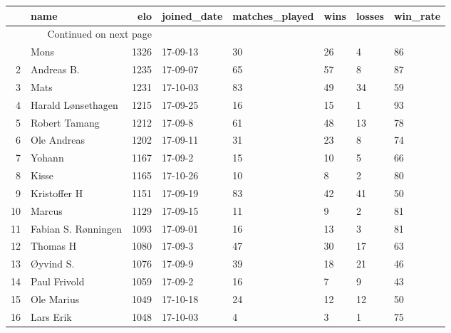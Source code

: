 \begin{longtable}{|r|l|r|l|l|l|l|l|}
\toprule
{} &                 name &   elo & joined\_date &  matches\_played &  wins &  losses &  win\_rate \\
\midrule
\endhead
\midrule
\multicolumn{3}{r}{{Continued on next page}} \\
\midrule
\endfoot

\bottomrule
\endlastfoot
1  &                 Mons &  1326 &    17-09-13 &              30 &    26 &       4 &        86 \\
2  &           Andreas B. &  1235 &    17-09-07 &              65 &    57 &       8 &        87 \\
3  &                 Mats &  1231 &    17-10-03 &              83 &    49 &      34 &        59 \\
4  &   Harald Lønsethagen &  1215 &    17-09-25 &              16 &    15 &       1 &        93 \\
5  &        Robert Tamang &  1212 &     17-09-8 &              61 &    48 &      13 &        78 \\
6  &          Ole Andreas &  1202 &    17-09-11 &              31 &    23 &       8 &        74 \\
7  &               Yohann &  1167 &     17-09-2 &              15 &    10 &       5 &        66 \\
8  &                Kisse &  1165 &    17-10-26 &              10 &     8 &       2 &        80 \\
9  &         Kristoffer H &  1151 &    17-09-19 &              83 &    42 &      41 &        50 \\
10 &               Marcus &  1129 &    17-09-15 &              11 &     9 &       2 &        81 \\
11 &  Fabian S. Rønningen &  1093 &    17-09-01 &              16 &    13 &       3 &        81 \\
12 &             Thomas H &  1080 &     17-09-3 &              47 &    30 &      17 &        63 \\
13 &            Øyvind S. &  1076 &     17-09-9 &              39 &    18 &      21 &        46 \\
14 &         Paul Frivold &  1059 &     17-09-2 &              16 &     7 &       9 &        43 \\
15 &           Ole Marius &  1049 &    17-10-18 &              24 &    12 &      12 &        50 \\
16 &            Lars Erik &  1048 &    17-10-03 &               4 &     3 &       1 &        75 \\

\end{longtable}
